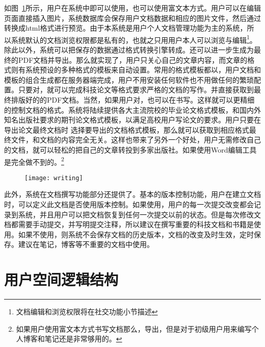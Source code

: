 如图~\ref{fig:xfig10}所示，用户在系统中即可以使用，也可以使用富文本方式。用户可以在编辑页面直接插入图片，系统数据库会保存用户文档数据和相应的图片文件，然后通过转换成html格式进行预览。由于本系统是用户个人文档管理功能为主的系统，所以系统默认的文档浏览权限都是私有的，也就之只用用户本人可以浏览与编辑\footnote{文档编辑和浏览权限将在社交功能小节描述}。除此以外，系统可以把保存的数据通过格式转换引擎转成。还可以进一步生成为最终的PDF文档并导出。那么就实现了，用户只关心自己的文章内容，而文章的格式则有系统预设的多种格式的模板来自动设置。常用的格式模板都以，用户文档和模板的组合生成都在服务器端完成，用户不用安装任何软件也不用做任何的繁琐配置。只要对，就可以完成科技论文等格式要求严格的文档的写作。并直接获取到最终排版好的的PDF文档。当然，如果用户对，也可以在书写。这样就可以更精细的控制文档的格式。系统将陆续提供各大主流院校的毕业论文格式模板，和国内外知名出版社要求的期刊论文格式模板，以满足高校用户写论文的要求。用户只要在导出论文最终文档时 选择要导出的文档格式模板，那么就可以获取到相应格式最终文件，和文档的内容完全无关。这样也带来了另外一个好处，用户无需修改自己的文档，就可以轻松的把自己的文章转投到多家出版社。如果使用Word编辑工具是完全做不到的。\footnote{如果用户使用富文本方式书写文档那么，导出，但是对于初级用户用来编写个人博客和笔记还是非常够用的。}
\begin{figure}[H]
  \centering
  \texttt{[image: writing]}
  \caption{}
  \label{fig:xfig10}
\end{figure}

此外，系统在文档撰写功能部分还提供了。基本的版本控制功能，用户在建立文档时，可以定义此文档是否使用版本控制。如果使用，用户的每一次提交改变都会记录到系统，并且用户可以把文档恢复到任何一次提交以前的状态。但是每次修改文档都需要手动提交，并写明提交注释，所以建议在撰写重要的科技文档和书籍是使用。如果不使用，则系统不会保存文档的历史版本，文档的改变及时生效，定时保存。建议在笔记，博客等不重要的文档中使用。

\section{用户空间逻辑结构}
\label{sec:personstructure}

